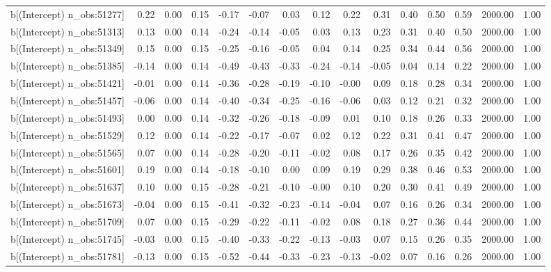 \begin{table}[ht]
\begin{tabular}{rrrrrrrrrrrrrrr}
  b[(Intercept) n\_obs:51277] & 0.22 & 0.00 & 0.15 & -0.17 & -0.07 & 0.03 & 0.12 & 0.22 & 0.31 & 0.40 & 0.50 & 0.59 & 2000.00 & 1.00 \\ 
  b[(Intercept) n\_obs:51313] & 0.13 & 0.00 & 0.14 & -0.24 & -0.14 & -0.05 & 0.03 & 0.13 & 0.23 & 0.31 & 0.40 & 0.50 & 2000.00 & 1.00 \\ 
  b[(Intercept) n\_obs:51349] & 0.15 & 0.00 & 0.15 & -0.25 & -0.16 & -0.05 & 0.04 & 0.14 & 0.25 & 0.34 & 0.44 & 0.56 & 2000.00 & 1.00 \\ 
  b[(Intercept) n\_obs:51385] & -0.14 & 0.00 & 0.14 & -0.49 & -0.43 & -0.33 & -0.24 & -0.14 & -0.05 & 0.04 & 0.14 & 0.22 & 2000.00 & 1.00 \\ 
  b[(Intercept) n\_obs:51421] & -0.01 & 0.00 & 0.14 & -0.36 & -0.28 & -0.19 & -0.10 & -0.00 & 0.09 & 0.18 & 0.28 & 0.34 & 2000.00 & 1.00 \\ 
  b[(Intercept) n\_obs:51457] & -0.06 & 0.00 & 0.14 & -0.40 & -0.34 & -0.25 & -0.16 & -0.06 & 0.03 & 0.12 & 0.21 & 0.32 & 2000.00 & 1.00 \\ 
  b[(Intercept) n\_obs:51493] & 0.00 & 0.00 & 0.14 & -0.32 & -0.26 & -0.18 & -0.09 & 0.01 & 0.10 & 0.18 & 0.26 & 0.33 & 2000.00 & 1.00 \\ 
  b[(Intercept) n\_obs:51529] & 0.12 & 0.00 & 0.14 & -0.22 & -0.17 & -0.07 & 0.02 & 0.12 & 0.22 & 0.31 & 0.41 & 0.47 & 2000.00 & 1.00 \\ 
  b[(Intercept) n\_obs:51565] & 0.07 & 0.00 & 0.14 & -0.28 & -0.20 & -0.11 & -0.02 & 0.08 & 0.17 & 0.26 & 0.35 & 0.42 & 2000.00 & 1.00 \\ 
  b[(Intercept) n\_obs:51601] & 0.19 & 0.00 & 0.14 & -0.18 & -0.10 & 0.00 & 0.09 & 0.19 & 0.29 & 0.38 & 0.46 & 0.53 & 2000.00 & 1.00 \\ 
  b[(Intercept) n\_obs:51637] & 0.10 & 0.00 & 0.15 & -0.28 & -0.21 & -0.10 & -0.00 & 0.10 & 0.20 & 0.30 & 0.41 & 0.49 & 2000.00 & 1.00 \\ 
  b[(Intercept) n\_obs:51673] & -0.04 & 0.00 & 0.15 & -0.41 & -0.32 & -0.23 & -0.14 & -0.04 & 0.07 & 0.16 & 0.26 & 0.34 & 2000.00 & 1.00 \\ 
  b[(Intercept) n\_obs:51709] & 0.07 & 0.00 & 0.15 & -0.29 & -0.22 & -0.11 & -0.02 & 0.08 & 0.18 & 0.27 & 0.36 & 0.44 & 2000.00 & 1.00 \\ 
  b[(Intercept) n\_obs:51745] & -0.03 & 0.00 & 0.15 & -0.40 & -0.33 & -0.22 & -0.13 & -0.03 & 0.07 & 0.15 & 0.26 & 0.35 & 2000.00 & 1.00 \\ 
  b[(Intercept) n\_obs:51781] & -0.13 & 0.00 & 0.15 & -0.52 & -0.44 & -0.33 & -0.23 & -0.13 & -0.02 & 0.07 & 0.16 & 0.26 & 2000.00 & 1.00 \\ 

\end{tabular}
\end{table}
